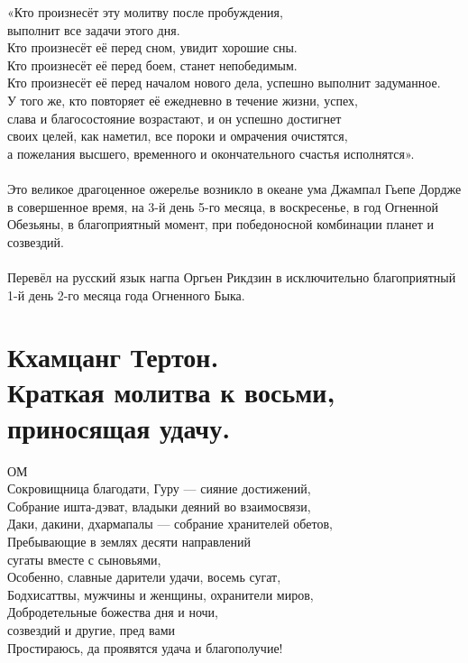 «Кто произнесёт эту молитву после пробуждения, \\ \indent выполнит все задачи этого дня.\\
Кто произнесёт её перед сном, увидит хорошие сны.\\
Кто произнесёт её перед боем, станет непобедимым.\\
Кто произнесёт её перед началом нового дела, успешно выполнит задуманное.\\
У того же, кто повторяет её ежедневно в течение жизни, успех,\\
слава и благосостояние возрастают, и он успешно достигнет\\
своих целей, как наметил, все пороки и омрачения очистятся,\\
а пожелания высшего, временного и окончательного счастья исполнятся».\\
\\
Это великое драгоценное ожерелье возникло в океане ума
Джампал Гьепе Дордже в совершенное время, на 3-й день
5-го месяца, в воскресенье, в год Огненной Обезьяны,
в благоприятный момент, при победоносной комбинации планет и созвездий.\\
\\
Перевёл на русский язык нагпа Оргьен Рикдзин
в исключительно благоприятный 1-й день 2-го месяца года Огненного Быка.
\normalsize
\newpage
\section{Кхамцанг Тертон.\\Краткая молитва к восьми, \\приносящая удачу.}
ОМ\\
Сокровищница благодати, Гуру — сияние достижений,\\
Собрание ишта-дэват, владыки деяний во взаимосвязи,\\
Даки, дакини, дхармапалы — собрание хранителей обетов,\\
Пребывающие в землях десяти направлений \\ \indent сугаты вместе с сыновьями,\\
Особенно, славные дарители удачи, восемь сугат,\\
Бодхисаттвы, мужчины и женщины, охранители миров,\\
Добродетельные божества дня и ночи, \\ \indent созвездий и другие, пред вами\\
Простираюсь, да проявятся удача и благополучие!\\

